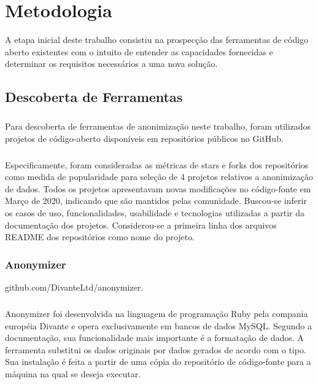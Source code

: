 \chapter{Metodologia}
\label{cap3}

A etapa inicial deste trabalho consistiu na prospecção das ferramentas de código aberto existentes com o intuito de entender
as capacidades fornecidas e determinar os requisitos necessários a uma nova solução.

\section{Descoberta de Ferramentas}

\paragraph{}
Para descoberta de ferramentas de anonimização neste trabalho, foram utilizados projetos de código-aberto disponíveis em repositórios públicos no GitHub. 

\paragraph{}
Especificamente, foram consideradas as métricas de stars e forks dos repositórios como medida de popularidade para seleção de 4 projetos relativos a anonimização de dados. Todos os projetos apresentavam novas modificações no código-fonte em Março de 2020, indicando que são mantidos pelas comunidade. Buscou-se inferir os casos de uso, funcionalidades, usabilidade e tecnologias utilizadas a partir da documentação dos projetos. Considerou-se a primeira linha dos arquivos README dos repositórios como nome do projeto.

\subsection{Anonymizer}

github.com/DivanteLtd/anonymizer.

\paragraph{} Anonymizer foi desenvolvida na linguagem de programação Ruby pela compania européia Divante e opera exclusivamente em bancos de dados MySQL. Segundo a documentação, sua funcionalidade mais importante é a formatação de dados. A ferramenta substitui os dados originais por dados gerados de acordo com o tipo. Sua instalação é feita a partir de uma cópia do repositório de código-fonte para a máquina na qual se deseja executar.

